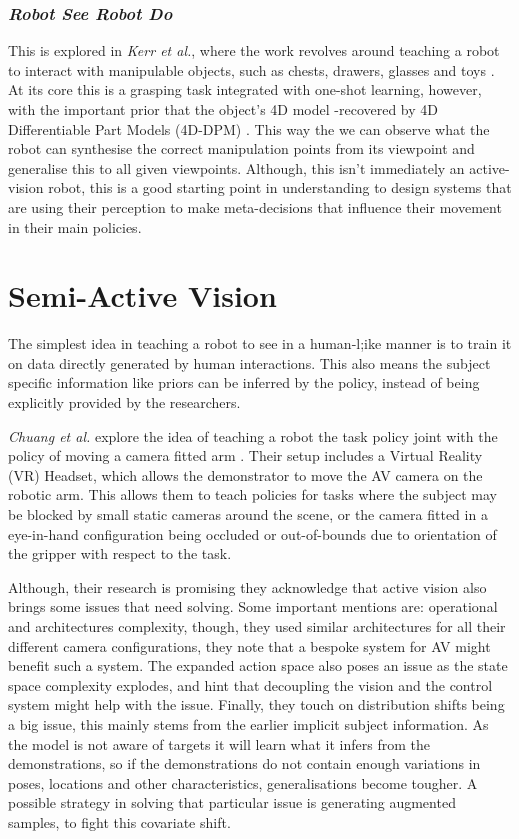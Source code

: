 \subsubsection{\emph{Robot See Robot Do}}
This is explored in \emph{Kerr et al.}, where the work revolves around teaching a robot to interact with manipulable objects, such as chests, drawers, glasses and toys \cite{kerr2024robotrobotdoimitating}. At its core this is a grasping task integrated with one-shot learning, however, with the important prior that the object's 4D model -recovered by 4D Differentiable Part Models (4D-DPM) \cite{}. This way the we can observe what the robot can synthesise the correct manipulation points from its viewpoint and generalise this to all given viewpoints. Although, this isn't immediately an active-vision robot, this is a good starting point in understanding to design systems that are using their perception to make meta-decisions that influence their movement in their main policies. 

\section{Semi-Active Vision}
The simplest idea in teaching a robot to see in a human-l;ike manner is to train it on data directly generated by human interactions. This also means the subject specific information like priors can be inferred by the policy, instead of being explicitly provided by the researchers.

\emph{Chuang et al.} explore the idea of teaching a robot the task policy joint with the policy of moving a camera fitted arm \cite{chuang2024activevisionneedexploring}. Their setup includes a Virtual Reality (VR) Headset, which allows the demonstrator to move the AV camera on the robotic arm. This allows them to teach policies for tasks where the subject may be blocked by small static cameras around the scene, or the camera fitted in a eye-in-hand configuration being occluded or out-of-bounds due to orientation of the gripper with respect to the task. 

Although, their research is promising they acknowledge that active vision also brings some issues that need solving. Some important mentions are: operational and architectures complexity, though, they used similar architectures for all their different camera configurations, they note that a bespoke system for AV might benefit such a system. The expanded action space also poses an issue as the state space complexity explodes, and hint that decoupling the vision and the control system might help with the issue. Finally, they touch on distribution shifts being a big issue, this mainly stems from the earlier implicit subject information. As the model is not aware of targets it will learn what it infers from the demonstrations, so if the demonstrations do not contain enough variations in poses, locations and other characteristics, generalisations become tougher. A possible strategy in solving that particular issue is generating augmented samples, to fight this covariate shift.

